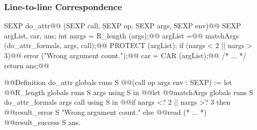 \documentclass{beamer}
\begin{document}
\begin{frame}[fragile]
    \frametitle{Line-to-line Correspondence}

    \begin{widemargin}\centering{}
\begin{minipage}{.53\textwidth}
\begin{ccode}[fontsize=\tiny]
SEXP do_attr@@
    (SEXP call, SEXP op, SEXP args, SEXP env){@@
  SEXP argList, car, ans;
  int nargs = R_length (args);@@
  argList =@@
    matchArgs (do_attr_formals, args, call);@@
  PROTECT (argList);
  if (nargs < 2 || nargs > 3)@@
    error ("Wrong argument count.");@@
  car = CAR (argList);@@
  /* ... */
  return ans;@@
}
\end{ccode}
\end{minipage}
\qquad
\begin{minipage}{.5\textwidth}
\begin{coqcode}[fontsize=\tiny]
@@Definition do_attr globals runs S
    @@(call op args env : SEXP) :=
  let%
    @@R_length globals runs S args using S in
  @@let%
    @@matchArgs globals runs S
      do_attr_formals args call using S in
  @@if nargs <? 2 || nargs >? 3 then
    @@result_error S "Wrong argument count."
  else
    @@read%
    (* ... *)
    @@result_success S ans.
\end{coqcode}
\end{minipage}
    \end{widemargin}


\end{frame}
\end{document}
